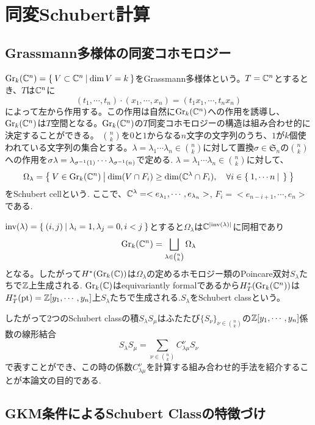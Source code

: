 \section{同変Schubert計算}
\subsection{Grassmann多様体の同変コホモロジー}
$\text{Gr}_k(\mathbb{C}^n)=\left\{\:V\subset \mathbb{C}^n\:\middle|\:\dim V = k\:\right\}$をGrassmann多様体という。$T=\mathbb{C}^n$とするとき、$T$は$\mathbb{C}^n$に
\[
(t_1,\cdots,t_n)\cdot(x_1,\cdots,x_n)=(t_1x_1,\cdots,t_nx_n)
\]
によって左から作用する。この作用は自然に$\text{Gr}_k(\mathbb{C}^n)$への作用を誘導し、$\text{Gr}_k(\mathbb{C}^n)$は$T$空間となる。$\text{Gr}_k(\mathbb{C}^n)$の$T$同変コホモロジーの構造は組み合わせ的に決定することができる。
$\binom{n}{k}$を$0$と$1$からなる$n$文字の文字列のうち、$1$が$k$個使われている文字列の集合とする。$\lambda=\lambda_1\cdots \lambda_n\in\binom{n}{k}$に対して置換$\sigma\in\mathfrak{S}_n$の$\binom{n}{k}$への作用を$\sigma\lambda=\lambda_{\sigma^{-1}(1)}\cdots\lambda_{\sigma^{-1}(n)}$で定める.
$\lambda=\lambda_1\cdots \lambda_n\in\binom{n}{k}$に対して、
\[
\Omega_\lambda=\left\{\:V\in \text{Gr}_k(\mathbb{C}^n)\:\middle|\:\dim(V\cap F_i)\geq \dim(\mathbb{C}^\lambda\cap F_i),\quad \forall i\in \left\{\:1,\cdots n\:\middle|\:\:\right\}\:\right\}
\]
をSchubert cellという. ここで、$\mathbb{C}^\lambda=<e_{\lambda_1},\cdots,e_{\lambda_n}>$, $F_i=<e_{n-i+1},\cdots,e_n>$である. 

$\text{inv}(\lambda)=\left\{\:(i,j)\:\middle|\:\lambda_i=1, \lambda_j=0, i<j\:\right\}$とすると$\Omega_\lambda$は$\mathbb{C}^{|\text{inv}(\lambda)|}$に同相であり
\[
\text{Gr}_k(\mathbb{C}^n)=\bigsqcup_{\lambda\in\binom{n}{k}}\Omega_\lambda
\]
となる。したがって$H^*(\text{Gr}_k(\mathbb{C}))$は$\Omega_\lambda$の定めるホモロジー類のPoincare双対$S_\lambda$たちで$\mathbb{Z}$上生成される. $\text{Gr}_k(\mathbb{C})$はequivariantly formalであるから$H^*_T(\text{Gr}_k(\mathbb{C}^n))$は$H^*_T(\text{pt})=\mathbb{Z}[y_1,\cdots,y_n]$上$S_\lambda$たちで生成される.$S_\lambda$をSchubert classという。

したがって$2$つのSchubert classの積$S_\lambda S_\mu$はふたたび$\{S_\nu\}_{\nu\in\binom{n}{k}}$の$\mathbb{Z}[y_1,\cdots,y_n]$係数の線形結合
\[
S_\lambda S_\mu=\sum_{\nu\in\binom{n}{k}}C^\nu_{\lambda\mu}S_\nu
\]
で表すことができ、この時の係数$C^{\nu}_{\lambda\mu}$を計算する組み合わせ的手法を紹介することが本論文の目的である.


\subsection{GKM条件によるSchubert Classの特徴づけ}

